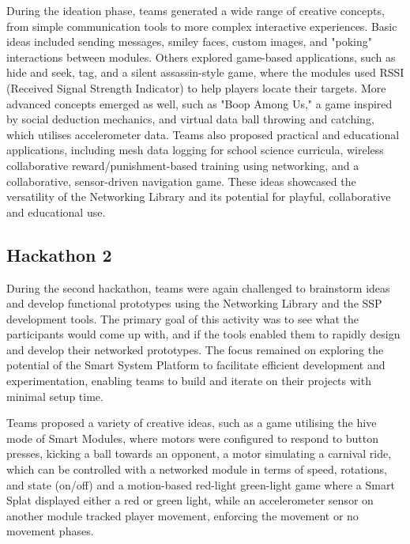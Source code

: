 During the ideation phase, teams generated a wide range of creative concepts, from simple communication tools to more complex interactive experiences. Basic ideas included sending messages, smiley faces, custom images, and "poking" interactions between modules. Others explored game-based applications, such as hide and seek, tag, and a silent assassin-style game, where the modules used RSSI (Received Signal Strength Indicator) to help players locate their targets. More advanced concepts emerged as well, such as "Boop Among Us," a game inspired by social deduction mechanics, and virtual data ball throwing and catching, which utilises accelerometer data. Teams also proposed practical and educational applications, including mesh data logging for school science curricula, wireless collaborative reward/punishment-based training using networking, and a collaborative, sensor-driven navigation game. These ideas showcased the versatility of the Networking Library and its potential for playful, collaborative and educational use.

\subsection{\label{sec:res_hackathon2}Hackathon 2}

During the second hackathon, teams were again challenged to brainstorm ideas and develop functional prototypes using the Networking Library and the SSP development tools. The primary goal of this activity was to see what the participants would come up with, and if the tools enabled them to rapidly design and develop their networked prototypes. The focus remained on exploring the potential of the Smart System Platform to facilitate efficient development and experimentation, enabling teams to build and iterate on their projects with minimal setup time.

Teams proposed a variety of creative ideas, such as a game utilising the hive mode of Smart Modules, where motors were configured to respond to button presses, kicking a ball towards an opponent, a motor simulating a carnival ride, which can be controlled  with a networked module in terms of speed, rotations, and state (on/off) and a motion-based red-light green-light game where a Smart Splat displayed either a red or green light, while an accelerometer sensor on another module tracked player movement, enforcing the movement or no movement phases.

